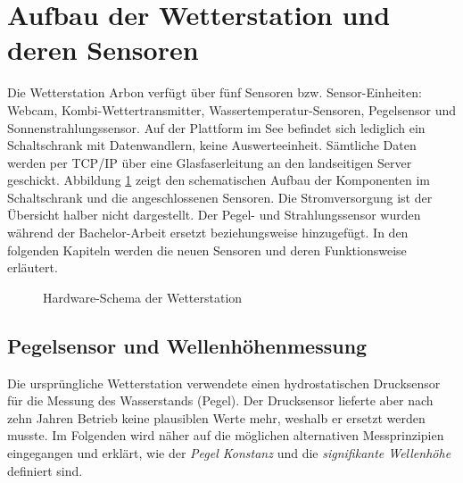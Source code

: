 \section{Aufbau der Wetterstation und deren Sensoren}
Die Wetterstation Arbon verfügt über fünf Sensoren bzw. Sensor-Einheiten: Webcam, Kombi-Wettertransmitter, Wassertemperatur-Sensoren, Pegelsensor und Sonnenstrahlungssensor. Auf der Plattform im See befindet sich lediglich ein Schaltschrank mit Datenwandlern, keine Auswerteeinheit. Sämtliche Daten werden per TCP/IP über eine Glasfaserleitung an den landseitigen Server geschickt. Abbildung \ref{img:schaltschrank} zeigt den schematischen Aufbau der Komponenten im Schaltschrank und die angeschlossenen Sensoren. Die Stromversorgung ist der Übersicht halber nicht dargestellt. Der Pegel- und Strahlungssensor wurden während der Bachelor-Arbeit ersetzt beziehungsweise hinzugefügt. In den folgenden Kapiteln werden die neuen Sensoren und deren Funktionsweise erläutert.

\begin{figure}[htbp]
	\centering
	\caption{Hardware-Schema der Wetterstation}
	\label{img:schaltschrank}
\end{figure}




\subsection{Pegelsensor und Wellenhöhenmessung}
Die ursprüngliche Wetterstation verwendete einen hydrostatischen Drucksensor für die Messung des Wasserstands (Pegel). Der Drucksensor lieferte aber nach zehn Jahren Betrieb keine plausiblen Werte mehr, weshalb er ersetzt werden musste. Im Folgenden wird näher auf die möglichen alternativen Messprinzipien eingegangen und erklärt, wie der \emph{Pegel Konstanz} und die \emph{signifikante Wellenhöhe} definiert sind.

